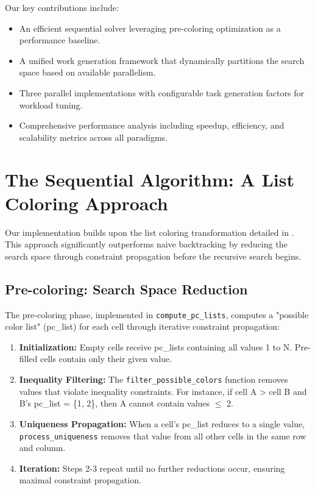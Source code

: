 \documentclass[10pt, conference]{IEEEtran}
\begin{document}
Our key contributions include:
\begin{itemize}
    \item An efficient sequential solver leveraging pre-coloring optimization as a performance baseline.
    \item A unified work generation framework that dynamically partitions the search space based on available parallelism.
    \item Three parallel implementations with configurable task generation factors for workload tuning.
    \item Comprehensive performance analysis including speedup, efficiency, and scalability metrics across all paradigms.
\end{itemize}

\section{The Sequential Algorithm: A List Coloring Approach}
Our implementation builds upon the list coloring transformation detailed in \cite{Sen2024Futoshiki}. This approach significantly outperforms naive backtracking by reducing the search space through constraint propagation before the recursive search begins.

\subsection{Pre-coloring: Search Space Reduction}
The pre-coloring phase, implemented in \texttt{compute\_pc\_lists}, computes a "possible color list" (pc\_list) for each cell through iterative constraint propagation:

\begin{enumerate}
    \item \textbf{Initialization:} Empty cells receive pc\_lists containing all values 1 to N. Pre-filled cells contain only their given value.
    
    \item \textbf{Inequality Filtering:} The \texttt{filter\_possible\_colors} function removes values that violate inequality constraints. For instance, if cell A > cell B and B's pc\_list = \{1, 2\}, then A cannot contain values $\leq$ 2.
    
    \item \textbf{Uniqueness Propagation:} When a cell's pc\_list reduces to a single value, \texttt{process\_uniqueness} removes that value from all other cells in the same row and column.
    
    \item \textbf{Iteration:} Steps 2-3 repeat until no further reductions occur, ensuring maximal constraint propagation.
\end{enumerate}
\end{document}
